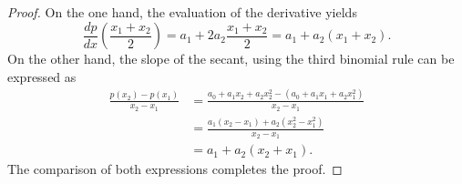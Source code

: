 \begin{proof}
On the one hand, the evaluation of the derivative yields
\begin{displaymath}
    \frac{dp}{dx}\left(\frac{x_1+x_2}{2}\right) = a_1 + 2 a_2 \frac{x_1 + x_2}{2} = a_1 + a_2(x_1 + x_2).
\end{displaymath}
On the other hand, the slope of the secant, using the third binomial rule can be expressed as
\begin{displaymath}
  \begin{array}{ll}
  \frac{p(x_2) - p(x_1)}{x_2 - x_1} 
&= \frac{a_0 + a_1 x_2 + a_2 x_2^2 - \left(a_0 + a_1 x_1 + a_2 x_1 ^2\right)}{x_2 - x_1} \\[1.0em]
  \quad &= \frac{a_1 (x_2 - x_1) + a_2 \left(x_2^2 - x_1^2\right)}{x_2 - x_1} \\[1.0em]
  \quad &= a_1 + a_2 (x_2 + x_1).
\end{array}
\end{displaymath}
The comparison of both expressions completes the proof.
\end{proof}

